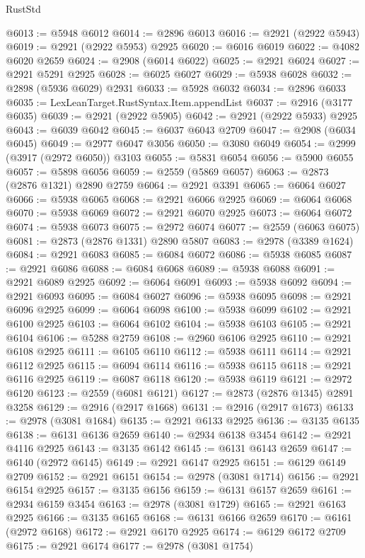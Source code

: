 \begin{lexlean}{RustStd}
\begin{coremodule}
@6013 := @5948 @6012
@6014 := @2896 @6013
@6016 := @2921 (@2922 @5943)
@6019 := @2921 (@2922 @5953) @2925
@6020 := @6016 @6019
@6022 := @4082 @6020 @2659
@6024 := @2908 (@6014 @6022)
@6025 := @2921 @6024
@6027 := @2921 @5291 @2925
@6028 := @6025 @6027
@6029 := @5938 @6028
@6032 := @2898 (@5936 @6029) @2931
@6033 := @5928 @6032
@6034 := @2896 @6033
@6035 := LexLeanTarget.RustSyntax.Item.appendList
@6037 := @2916 (@3177 @6035)
@6039 := @2921 (@2922 @5905)
@6042 := @2921 (@2922 @5933) @2925
@6043 := @6039 @6042
@6045 := @6037 @6043 @2709
@6047 := @2908 (@6034 @6045)
@6049 := @2977 @6047 @3056
@6050 := @3080 @6049
@6054 := @2999 (@3917 (@2972 @6050)) @3103
@6055 := @5831 @6054
@6056 := @5900 @6055
@6057 := @5898 @6056
@6059 := @2559 (@5869 @6057)
@6063 := @2873 (@2876 @1321) @2890 @2759
@6064 := @2921 @3391
@6065 := @6064 @6027
@6066 := @5938 @6065
@6068 := @2921 @6066 @2925
@6069 := @6064 @6068
@6070 := @5938 @6069
@6072 := @2921 @6070 @2925
@6073 := @6064 @6072
@6074 := @5938 @6073
@6075 := @2972 @6074
@6077 := @2559 (@6063 @6075)
@6081 := @2873 (@2876 @1331) @2890 @5807
@6083 := @2978 (@3389 @1624)
@6084 := @2921 @6083
@6085 := @6084 @6072
@6086 := @5938 @6085
@6087 := @2921 @6086
@6088 := @6084 @6068
@6089 := @5938 @6088
@6091 := @2921 @6089 @2925
@6092 := @6064 @6091
@6093 := @5938 @6092
@6094 := @2921 @6093
@6095 := @6084 @6027
@6096 := @5938 @6095
@6098 := @2921 @6096 @2925
@6099 := @6064 @6098
@6100 := @5938 @6099
@6102 := @2921 @6100 @2925
@6103 := @6064 @6102
@6104 := @5938 @6103
@6105 := @2921 @6104
@6106 := @5288 @2759
@6108 := @2960 @6106 @2925
@6110 := @2921 @6108 @2925
@6111 := @6105 @6110
@6112 := @5938 @6111
@6114 := @2921 @6112 @2925
@6115 := @6094 @6114
@6116 := @5938 @6115
@6118 := @2921 @6116 @2925
@6119 := @6087 @6118
@6120 := @5938 @6119
@6121 := @2972 @6120
@6123 := @2559 (@6081 @6121)
@6127 := @2873 (@2876 @1345) @2891 @3258
@6129 := @2916 (@2917 @1668)
@6131 := @2916 (@2917 @1673)
@6133 := @2978 (@3081 @1684)
@6135 := @2921 @6133 @2925
@6136 := @3135 @6135
@6138 := @6131 @6136 @2659
@6140 := @2934 @6138 @3454
@6142 := @2921 @4116 @2925
@6143 := @3135 @6142
@6145 := @6131 @6143 @2659
@6147 := @6140 (@2972 @6145)
@6149 := @2921 @6147 @2925
@6151 := @6129 @6149 @2709
@6152 := @2921 @6151
@6154 := @2978 (@3081 @1714)
@6156 := @2921 @6154 @2925
@6157 := @3135 @6156
@6159 := @6131 @6157 @2659
@6161 := @2934 @6159 @3454
@6163 := @2978 (@3081 @1729)
@6165 := @2921 @6163 @2925
@6166 := @3135 @6165
@6168 := @6131 @6166 @2659
@6170 := @6161 (@2972 @6168)
@6172 := @2921 @6170 @2925
@6174 := @6129 @6172 @2709
@6175 := @2921 @6174
@6177 := @2978 (@3081 @1754)

\end{coremodule}
\end{lexlean}
